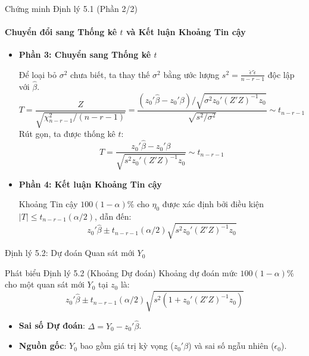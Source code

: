 \begin{frame}{Chứng minh Định lý 5.1 (Phần 2/2)}
    \framesubtitle{Chuyển đổi sang Thống kê $t$ và Kết luận Khoảng Tin cậy}

    \begin{itemize}
        \item \textbf{Phần 3: Chuyển sang Thống kê $t$}
        
        Để loại bỏ $\sigma^2$ chưa biết, ta thay thế $\sigma^2$ bằng ước lượng $s^2 = \frac{\hat{\epsilon}'\hat{\epsilon}}{n-r-1}$ độc lập với $\hat{\beta}$.
        \[
            T = \frac{Z}{\sqrt{\chi^2_{n-r-1}/(n-r-1)}} = \frac{(z_0'\hat{\beta} - z_0'\beta)/\sqrt{\sigma^2 z_0'(Z'Z)^{-1}z_0}}{\sqrt{s^2/\sigma^2}} \sim t_{n-r-1}
        \]
        Rút gọn, ta được thống kê $t$:
        \[
            T = \frac{z_0'\hat{\beta} - z_0'\beta}{\sqrt{s^2 z_0'(Z'Z)^{-1}z_0}} \sim t_{n-r-1}
        \]

        \item \textbf{Phần 4: Kết luận Khoảng Tin cậy}
       
        Khoảng Tin cậy $100(1-\alpha)\%$ cho $\eta_0$ được xác định bởi điều kiện $|T| \le t_{n-r-1}(\alpha/2)$, dẫn đến:
        \[
            z_0'\hat{\beta} \pm t_{n-r-1}(\alpha/2)\sqrt{s^2 z_0'(Z'Z)^{-1}z_0}
        \]
    \end{itemize}
\end{frame}
\begin{frame}{Định lý 5.2: Dự đoán Quan sát mới $Y_0$}

    \begin{block}{Phát biểu Định lý 5.2 (Khoảng Dự đoán)}
        Khoảng dự đoán mức $100(1-\alpha)\%$ cho một quan sát mới $Y_0$ tại $z_0$ là:
        \[
           z_0'\hat{\beta} \pm t_{n-r-1}(\alpha/2)\sqrt{s^2(1 + z_0'(Z'Z)^{-1}z_0)}
        \]
    \end{block}

    \begin{itemize}
        \item \textbf{Sai số Dự đoán}: $\Delta = Y_0 - z_0'\hat{\beta}$.
        \item \textbf{Nguồn gốc}: $Y_0$ bao gồm giá trị kỳ vọng ($z_0'\beta$) và sai số ngẫu nhiên ($\epsilon_0$).
    \end{itemize}
\end{frame}

